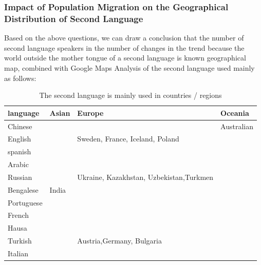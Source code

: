 \subsubsection{Impact of Population Migration on the Geographical Distribution of Second Language}
\noindent Based on the above questions, we can draw a conclusion that the number of second language speakers in the number of changes in the trend because the world outside the mother tongue of a second language is known geographical map, combined with Google Maps Analysis of the second language used mainly as follows:

\begin{table}[H]
	\centering
	\caption{ The second language is mainly used in countries / regions}
	\begin{tabular}{llp{5cm}p{5cm}}
		\toprule
		language & Asian & Europe & Oceania \\
		\midrule
		Chinese &       &       & Australian \\
		\midrule
		English &       & Sweden, France, Iceland, Poland &  \\	\midrule
		spanish &       &       &  \\	\midrule
		Arabic &       &       &  \\	\midrule
		Russian &       &Ukraine, Kazakhstan, Uzbekistan,Turkmen&  \\	\midrule
		Bengalese & India&       &  \\	\midrule
		Portuguese &       &       &  \\	\midrule
		French &       &       &  \\	\midrule
		Hausa &       &       &  \\	\midrule
		Turkish &       & Austria,Germany, Bulgaria &  \\	\midrule
		Italian &       &       &  \\
		\bottomrule
	\end{tabular}%
	\label{tab:addlabel}%
\end{table}%

